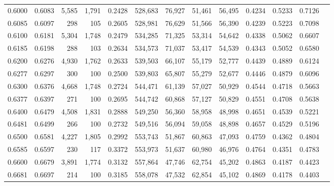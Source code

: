 \begin{tabular}{rrrrrrrrrrrrr}
0.6000 & 0.6083 &  5,585 & 1,791 &                                     0.2428 & 528,683 &  76,927 &  51,461 &  56,495 & 0.4234 & 0.5233 & 0.7126 \\
0.6085 & 0.6097 &    298 &   105 &                                     0.2605 & 528,981 &  76,629 &  51,566 &  56,390 & 0.4239 & 0.5223 & 0.7098 \\
0.6100 & 0.6181 &  5,304 & 1,748 &                                     0.2479 & 534,285 &  71,325 &  53,314 &  54,642 & 0.4338 & 0.5062 & 0.6607 \\
0.6185 & 0.6198 &    288 &   103 &                                     0.2634 & 534,573 &  71,037 &  53,417 &  54,539 & 0.4343 & 0.5052 & 0.6580 \\
0.6200 & 0.6276 &  4,930 & 1,762 &                                     0.2633 & 539,503 &  66,107 &  55,179 &  52,777 & 0.4439 & 0.4889 & 0.6124 \\
0.6277 & 0.6297 &    300 &   100 &                                     0.2500 & 539,803 &  65,807 &  55,279 &  52,677 & 0.4446 & 0.4879 & 0.6096 \\
0.6300 & 0.6376 &  4,668 & 1,748 &                                     0.2724 & 544,471 &  61,139 &  57,027 &  50,929 & 0.4544 & 0.4718 & 0.5663 \\
0.6377 & 0.6397 &    271 &   100 &                                     0.2695 & 544,742 &  60,868 &  57,127 &  50,829 & 0.4551 & 0.4708 & 0.5638 \\
0.6400 & 0.6479 &  4,508 & 1,831 &                                     0.2888 & 549,250 &  56,360 &  58,958 &  48,998 & 0.4651 & 0.4539 & 0.5221 \\
0.6481 & 0.6499 &    266 &   100 &                                     0.2732 & 549,516 &  56,094 &  59,058 &  48,898 & 0.4657 & 0.4529 & 0.5196 \\
0.6500 & 0.6581 &  4,227 & 1,805 &                                     0.2992 & 553,743 &  51,867 &  60,863 &  47,093 & 0.4759 & 0.4362 & 0.4804 \\
0.6585 & 0.6597 &    230 &   117 &                                     0.3372 & 553,973 &  51,637 &  60,980 &  46,976 & 0.4764 & 0.4351 & 0.4783 \\
0.6600 & 0.6679 &  3,891 & 1,774 &                                     0.3132 & 557,864 &  47,746 &  62,754 &  45,202 & 0.4863 & 0.4187 & 0.4423 \\
0.6681 & 0.6697 &    214 &   100 &                                     0.3185 & 558,078 &  47,532 &  62,854 &  45,102 & 0.4869 & 0.4178 & 0.4403 \\

\end{tabular}
